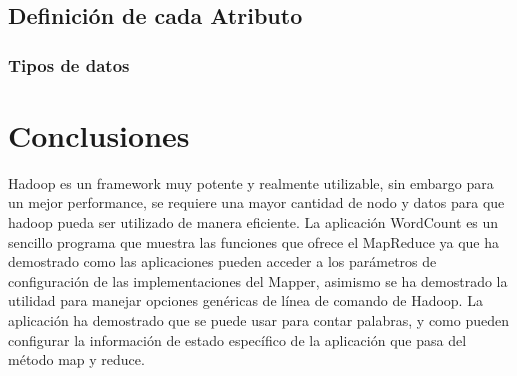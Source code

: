 \subsection{Definición de cada Atributo}
\subsubsection{Tipos de datos}
\clearpage


\clearpage
\section{Conclusiones}

Hadoop es un framework muy potente y realmente utilizable, sin embargo para un mejor performance, se requiere una mayor cantidad de nodo y datos para que hadoop pueda ser utilizado de manera eficiente. La aplicación WordCount es un sencillo programa que muestra las funciones que ofrece el MapReduce ya que ha demostrado como las aplicaciones pueden acceder a los parámetros de configuración de las implementaciones del Mapper, asimismo se ha demostrado la utilidad para manejar opciones genéricas de línea de comando de Hadoop. La aplicación ha demostrado que se puede usar para contar palabras, y como pueden configurar la información de estado específico de la aplicación que pasa del método map y reduce.
\clearpage
 